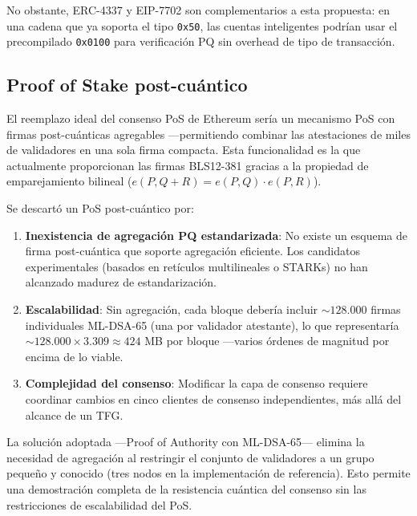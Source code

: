 No obstante, ERC-4337 y EIP-7702 son complementarios a esta propuesta: en una cadena que ya soporta el tipo \texttt{0x50}, las cuentas inteligentes podrían usar el precompilado \texttt{0x0100} para verificación PQ sin overhead de tipo de transacción.

\subsection{Proof of Stake post-cuántico}
\label{sec:pos_pq}

El reemplazo ideal del consenso PoS de Ethereum sería un mecanismo PoS con firmas post-cuánticas agregables ---permitiendo combinar las atestaciones de miles de validadores en una sola firma compacta. Esta funcionalidad es la que actualmente proporcionan las firmas BLS12-381 gracias a la propiedad de emparejamiento bilineal ($e(P, Q+R) = e(P, Q) \cdot e(P, R)$).

Se descartó un PoS post-cuántico por:

\begin{enumerate}
  \item \textbf{Inexistencia de agregación PQ estandarizada}: No existe un esquema de firma post-cuántica que soporte agregación eficiente. Los candidatos experimentales (basados en retículos multilineales o STARKs) no han alcanzado madurez de estandarización.
  
  \item \textbf{Escalabilidad}: Sin agregación, cada bloque debería incluir ${\sim}128.000$ firmas individuales ML-DSA-65 (una por validador atestante), lo que representaría ${\sim}128.000 \times 3.309 \approx 424$ MB por bloque ---varios órdenes de magnitud por encima de lo viable.
  
  \item \textbf{Complejidad del consenso}: Modificar la capa de consenso requiere coordinar cambios en cinco clientes de consenso independientes, más allá del alcance de un TFG.
\end{enumerate}

La solución adoptada ---Proof of Authority con ML-DSA-65--- elimina la necesidad de agregación al restringir el conjunto de validadores a un grupo pequeño y conocido (tres nodos en la implementación de referencia). Esto permite una demostración completa de la resistencia cuántica del consenso sin las restricciones de escalabilidad del PoS.

